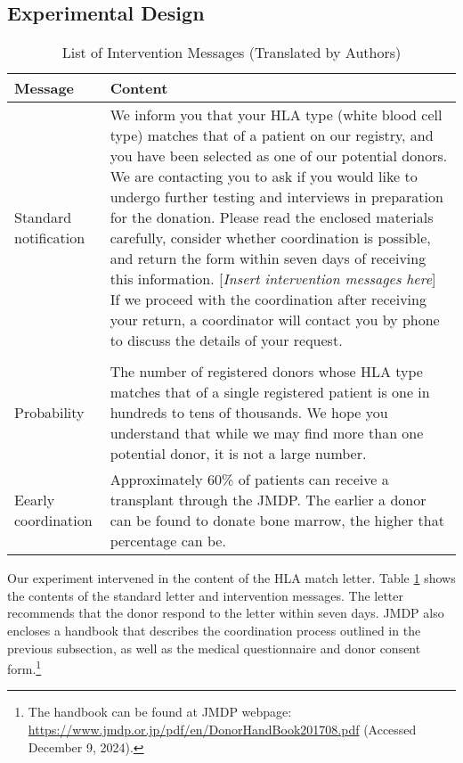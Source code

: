 \documentclass[12pt, a4paper]{article}
\begin{document}
\hypertarget{design}{%
\subsection{Experimental Design}\label{design}}

\begin{table}

\caption{\label{tab:list-message}List of Intervention Messages (Translated by Authors)}
\centering
\fontsize{8}{10}\selectfont
\begin{tabular}[t]{l>{\raggedright\arraybackslash}p{40em}}
\toprule
Message & Content\\
\midrule
Standard notification & We inform you that your HLA type (white blood cell type) matches that of a patient on our registry, and you have been selected as one of our potential donors. We are contacting you to ask if you would like to undergo further testing and interviews in preparation for the donation. Please read the enclosed materials carefully, consider whether coordination is possible, and return the form within seven days of receiving this information. [\emph{Insert intervention messages here}] If we proceed with the coordination after receiving your return, a coordinator will contact you by phone to discuss the details of your request.\\
\addlinespace[0.3em]
\multicolumn{2}{l}{\textbf{Intervention message}}\\
\hspace{1em}Probability & The number of registered donors whose HLA type matches that of a single registered patient is one in hundreds to tens of thousands. We hope you understand that while we may find more than one potential donor, it is not a large number.\\
\hspace{1em}Eearly coordination & Approximately 60\% of patients can receive a transplant through the JMDP. The earlier a donor can be found to donate bone marrow, the higher that percentage can be.\\
\bottomrule
\end{tabular}
\end{table}

Our experiment intervened in the content of the HLA match letter. Table \ref{tab:list-message} shows the contents of the standard letter and intervention messages. The letter recommends that the donor respond to the letter within seven days. JMDP also encloses a handbook that describes the coordination process outlined in the previous subsection, as well as the medical questionnaire and donor consent form.\footnote{The handbook can be found at JMDP webpage: \url{https://www.jmdp.or.jp/pdf/en/DonorHandBook201708.pdf} (Accessed December 9, 2024).}
\end{document}
